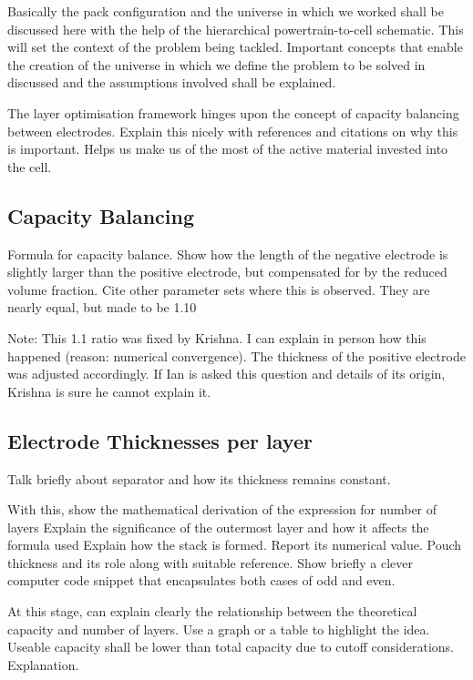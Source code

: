 Basically the  pack configuration and the  universe in which we  worked shall be
discussed here with  the help of the  hierarchical powertrain-to-cell schematic.
This will set the context of  the problem being tackled. Important concepts that
enable the creation of the universe in  which we define the problem to be solved
in discussed and the assumptions involved shall be explained.

The layer optimisation  framework hinges upon the concept  of capacity balancing
between electrodes.  Explain this  nicely with references  and citations  on why
this is important. Helps us make us  of the most of the active material invested
into the cell.


\subsection{Capacity Balancing}
Formula for capacity  balance. Show how the length of  the negative electrode is
slightly larger than the positive electrode,  but compensated for by the reduced
volume fraction.  Cite other  parameter sets  where this  is observed.  They are
nearly equal, but made to be 1.10

Note:  This  1.1 ratio  was  fixed  by Krishna.  I  can  explain in  person  how
this happened  (reason: numerical  convergence). The  thickness of  the positive
electrode was adjusted accordingly. If Ian is asked this question and details of
its origin, Krishna is sure he cannot explain it.

\subsection{Electrode Thicknesses per layer}
Talk briefly about separator and how its thickness remains constant.

With this,  show the  mathematical derivation  of the  expression for  number of
layers Explain  the significance of the  outermost layer and how  it affects the
formula used Explain how the stack  is formed. Report its numerical value. Pouch
thickness and  its role  along with  suitable reference.  Show briefly  a clever
computer code snippet that encapsulates both cases of odd and even.

At  this stage,  can explain  clearly the  relationship between  the theoretical
capacity  and  number of  layers.  Use  a graph  or  a  table to  highlight  the
idea.  Useable  capacity shall  be  lower  than  total  capacity due  to  cutoff
considerations. Explanation.

